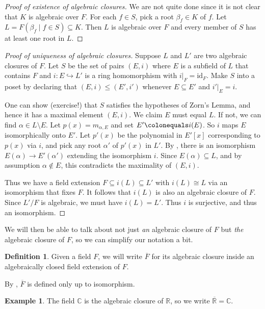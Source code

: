 \documentclass[12pt]{report}
\numberwithin{equation}{section}
\numberwithin{theorem}{chapter}
\theoremstyle{definition}
\newtheorem{definition}[theorem]{Definition}
\newtheorem{example}[theorem]{Example}
\newtheorem*{basic properties}{Basic Properties}
\newtheorem*{Important Remark}{Important Remark}
\newcommand{\C}{\mathbb{C}}
\begin{document}
\begin{proof}[Proof of existence of algebraic closures]
We are not quite done since it is not clear that $K$ is algebraic over $F$. For each $f \in S$, pick a root $\beta_f \in K$ of $f$. Let $L=F(\beta_f \mid f \in S) \subseteq K$.
Then $L$ is algebraic over $F$ and every member of $S$ has at least one root in $L$.
\end{proof}


\begin{proof}[Proof of uniqueness of algebraic closures]
Suppose $L$ and $L'$ are two algebraic closures of $F$.
Let $S$ be the set of pairs $(E,i)$ where $E$ is a subfield of $L$ that contains $F$ and $i: E \hookrightarrow L'$ is a ring homomorphism with $i|_F = \mathrm{id}_F$. Make $S$ into a poset by declaring that $(E,i) \leq (E',i')$ whenever $E \subseteq E'$ and $i'|_E = i$.

One can show (exercise!) that $S$ satisfies the hypotheses of Zorn's Lemma, and hence it has a maximal element $(E,i)$. We claim $E$ must equal $L$. If not, we can find $\alpha \in L \setminus E$. Let $p(x) = m_{\alpha, E}$ and set $E' \colonequals i(E)$. So $i$ maps $E$ isomorphically onto $E'$.
Let $p'(x)$ be the polynomial in $E'[x]$ corresponding to $p(x)$ via $i$, and pick any root $\alpha'$ of $p'(x)$ in $L'$.
By , there is an isomorphism $E(\alpha) \to E'(\alpha')$
extending the isomorphism $i$. Since $E(\alpha) \subseteq L$, and by assumption $\alpha \notin E$, this contradicts the maximality of $(E, i)$.

Thus we have a field extension $F \subseteq i(L) \subseteq L'$ with $i(L) \cong L$ via an isomorphism that fixes $F$. It follows that $i(L)$ is also an algebraic closure of $F$. Since $L'/F$ is algebraic, we must have $i(L) = L'$. Thus $i$ is surjective, and thus an isomorphism.
\end{proof}


We will then be able to talk about not just \emph{an} algebraic closure of $F$ but \emph{the} algebraic closure of $F$, so we can simplify our notation a bit.


\begin{definition}
	Given a field $F$, we will write $\overline{F}$ for its algebraic closure inside an algebraically closed field extension of $F$.
\end{definition}


By , $\overline{F}$ is defined only up to isomorphism.


\begin{example}
	The field $\C$ is the algebraic closure of $\mathbb{R}$, so we write $\overline{\mathbb{R}} = \C$.
\end{example}
\end{document}
